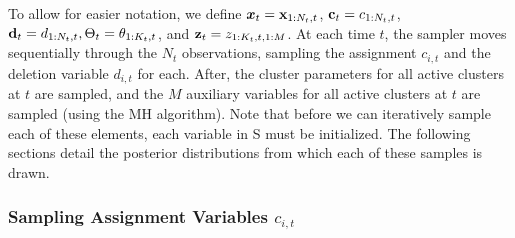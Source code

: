 \documentclass{article}
\begin{document}
To allow for easier notation, we define $\boldsymbol{x}_{t} = \bold{x}_{1:N_{t},t}$, $\bold{c}_{t} = c_{1:N_{t},t}$, $\bold{d}_{t} = d_{1:N_{t},t}, \Theta_{t} = \theta_{1:K_{t}, t}$, and $\bold{z}_{t} = z_{1:K_{t},t,1:M}$.
At each time $t$, the sampler moves sequentially through the $N_{t}$ observations, sampling the assignment $c_{i,t}$ and the deletion variable $d_{i,t}$ for each. After, the cluster parameters for all active clusters at $t$ are sampled, and the $M$ auxiliary variables for all active clusters at $t$ are sampled (using the MH algorithm). Note that before we can iteratively sample each of these elements, each variable in S must be initialized. The following sections detail the posterior distributions from which each of these samples is drawn.





\subsubsection{Sampling Assignment Variables $c_{i,t}$}
\label{sec:sample_assignments}
\end{document}
